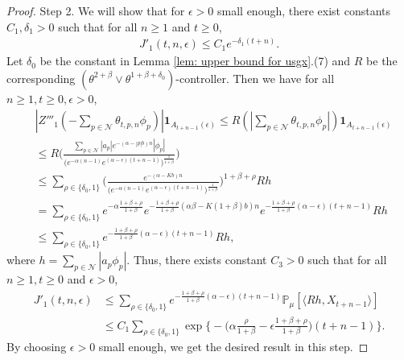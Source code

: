 \documentclass[12pt,a4paper]{amsart}
\theoremstyle{plain}
\theoremstyle{definition}
\numberwithin{equation}{section}
\begin{document}
\begin{proof}
    Step 2.
    We will show that for $\epsilon>0$ small enough, there exist constants $C_1,\delta_1>0$ such that for all $n\geq 1$ and $t\geq 0$,
\begin{align}\label{eq:large rate J1}
    J'_1(t,n,\epsilon)\leq C_1 e^{-\delta_1(t+n)}.
\end{align}
    Let $\delta_0$ be the constant in Lemma \ref{lem: upper bound for usgx}.(7) and $R$ be the corresponding $(\theta^{2+\beta}\vee \theta^{1+\beta+\delta_0})$-controller.
    Then we have for all $n\geq 1, t\geq 0, \epsilon > 0$,
\begin{align}
    & |Z'''_1(-\sum_{p\in \mathcal{N}}\theta_{t,p,n}\phi_p)|\mathbf{1}_{A_{t+n-1}(\epsilon)}
    \leq R(|\sum_{p\in\mathcal{N}}\theta_{t,p,n}\phi_p|)\mathbf{1}_{A_{t+n-1}(\epsilon)}
    \\&\leq R \Big(\frac{\sum_{p\in\mathcal{N}}|a_p|e^{-(\alpha-|p|b)n}|\phi_p|}{\big(e^{-\alpha(n-1)}e^{(\alpha-\epsilon)(t+n-1)}\big)^{\frac{1}{1+\beta}}}\Big)
    \\&\leq \sum_{\rho\in\{\delta_0,1\}}\Big(\frac{e^{-(\alpha-Kb)n}}{\big(e^{-\alpha(n-1)}e^{(\alpha-\epsilon)(t+n-1)}\big)^{\frac{1}{1+\beta}}}\Big)^{1+\beta+\rho}Rh
    \\&=\sum_{\rho\in\{\delta_0,1\}}e^{-\alpha\frac{1+\beta+\rho}{1+\beta}}e^{-\frac{1+\beta+\rho}{1+\beta}(\alpha\beta-K(1+\beta)b)n}e^{-\frac{1+\beta+\rho}{1+\beta}(\alpha-\epsilon)(t+n-1)}Rh
    \\&\leq \sum_{\rho\in\{\delta_0,1\}}e^{-\frac{1+\beta+\rho}{1+\beta}(\alpha-\epsilon)(t+n-1)}Rh,
\end{align}
    where $h=\sum_{p\in \mathcal{N}}|a_p\phi_p|$.
    Thus, there exists constant $C_3>0$ such that for all $n\geq 1,  t\geq 0$ and $\epsilon > 0$,
\begin{align}
\label{eq: estimate of J11}
     J'_1(t,n,\epsilon)&
       \leq  \sum_{\rho\in\{\delta_0,1\}}e^{-\frac{1+\beta+\rho}{1+\beta}(\alpha-\epsilon)(t+n-1)}\mathbb{P}_{\mu}[\langle Rh,X_{t+n-1}\rangle]\\
     & \leq C_1\sum_{\rho\in\{\delta_0,1\}}\exp\Big\{-\Big(\alpha\frac{\rho}{1+\beta}-\epsilon\frac{1+\beta+\rho}{1+\beta}\Big)(t+n-1)\Big\}.
\end{align}
    By choosing $\epsilon>0$ small enough, we get the desired result in this step.


\end{proof}
\end{document}

